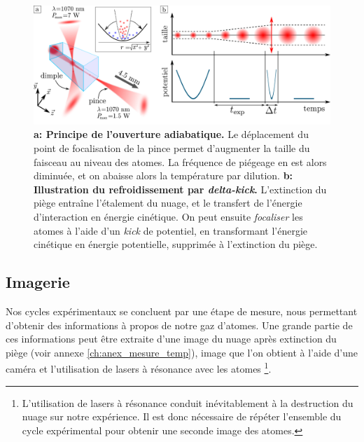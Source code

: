 \begin{figure}
\centering
\includegraphics[width=\textwidth]{Fig/BEC_manip/adia_opening_and_delta_kick2.pdf}
\caption{\textbf{a: Principe de l'ouverture adiabatique.} Le déplacement du point de focalisation de la pince permet d'augmenter la taille du faisceau au niveau des atomes. La fréquence de piégeage en est alors diminuée, et on abaisse alors la température par dilution. \textbf{b: Illustration du refroidissement par \emph{delta-kick}.} L'extinction du piège entraîne l'étalement du nuage, et le transfert de l'énergie d'interaction en énergie cinétique. On peut ensuite \textit{focaliser} les atomes à l'aide d'un \textit{kick} de potentiel, en transformant l'énergie cinétique en énergie potentielle, supprimée à l'extinction du piège.}
\label{fig:adia_opening_and_delta_kick}
\end{figure}















\subsection{Imagerie}
\label{sc:imagerie}
Nos cycles expérimentaux se concluent par une étape de mesure, nous permettant d'obtenir des informations à propos de notre gaz d'atomes. Une grande partie de ces informations peut être extraite d'une image du nuage après extinction du piège (voir annexe \ref{ch:anex_mesure_temp}), image que l'on obtient à l'aide d'une caméra et l'utilisation de lasers à résonance avec les atomes \footnote{L'utilisation de lasers à résonance conduit inévitablement à la destruction du nuage sur notre expérience. Il est donc nécessaire de répéter l'ensemble du cycle expérimental pour obtenir une seconde image des atomes.}. %

